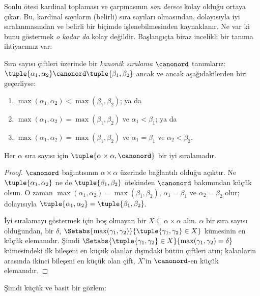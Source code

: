 \documentclass[../../../include/open-logic-section]{subfiles}
\begin{document}


Sonlu ötesi kardinal toplaması ve çarpmasının \emph{son derece} kolay
olduğu ortaya çıkar. Bu, kardinal sayıların (belirli) sıra sayıları
olmasından, dolayısıyla iyi sıralanmasından ve belirli bir biçimde
işlenebilmesinden kaynaklanır. Ne var ki bunu göstermek \emph{o kadar da}
kolay değildir. Başlangıçta biraz incelikli bir tanıma ihtiyacımız var:

\begin{defn}
Sıra sayısı çiftleri üzerinde bir \emph{kanonik sıralama} $\canonord$
tanımlarız: $\tuple{\alpha_1, \alpha_2} \canonord
\tuple{\beta_1, \beta_2}$ ancak ve ancak aşağıdakilerden biri geçerliyse:
\begin{enumerate}
	\item $\max(\alpha_1, \alpha_2) < \max(\beta_1, \beta_2)$; ya da
	\item $\max(\alpha_1, \alpha_2) = \max(\beta_1, \beta_2)$ ve
	$\alpha_1 < \beta_1$; ya da
	\item $\max(\alpha_1, \alpha_2) = \max(\beta_1, \beta_2)$ ve
	$\alpha_1 = \beta_1$ ve $\alpha_2 < \beta_2$.
\end{enumerate}
\end{defn}

\begin{lem}
Her $\alpha$ sıra sayısı için $\tuple{\alpha \times \alpha, \canonord}$
bir iyi sıralamadır.
\end{lem}

\begin{proof}
$\canonord$ bağıntısının $\alpha\times\alpha$ üzerinde bağlantılı olduğu
açıktır. Ne $\tuple{\alpha_1,\alpha_2}$ ne de
$\tuple{\beta_1,\beta_2}$ ötekinden $\canonord$ bakımından küçük olsun.
O zaman $\max(\alpha_1,\alpha_2)=\max(\beta_1,\beta_2)$,
$\alpha_1=\beta_1$ ve $\alpha_2=\beta_2$ olur; dolayısıyla
$\tuple{\alpha_1,\alpha_2}=\tuple{\beta_1,\beta_2}$.

İyi sıralamayı göstermek için boş olmayan bir
$X\subseteq\alpha\times\alpha$ alın. $\alpha$ bir sıra sayısı olduğundan,
bir $\delta$, $\Setabs{\max(\gamma_1, \gamma_2)}{\tuple{\gamma_1,
\gamma_2} \in X}$ kümesinin en küçük elemanıdır. Şimdi
$\Setabs{\tuple{\gamma_1,\gamma_2} \in X}{\max(\gamma_1, \gamma_2) =
\delta}$ kümesindeki ilk bileşeni en küçük olanlar dışındaki bütün
çiftleri atın; kalanların arasında ikinci bileşeni en küçük olan çift,
$X$'in $\canonord$-en küçük elemanıdır.
\end{proof}
\noindent
Şimdi küçük ve basit bir gözlem:
\end{document}
